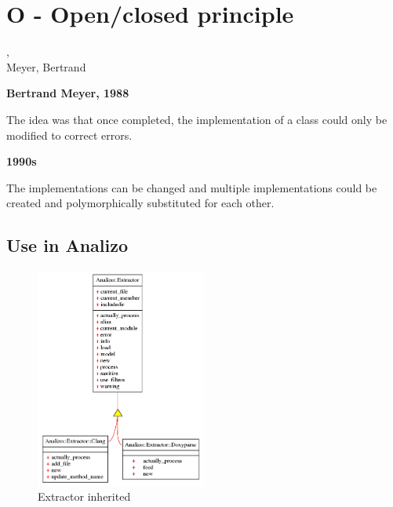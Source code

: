 

\section{O - Open/closed principle} %
\label{sec:o}

\begin{frame}
	, \\Meyer, Bertrand
\end{frame}

\begin{frame}


\begin{Parallel}[v]{5cm}{5cm}
    \ParallelLText%
    {
    	\textbf{Bertrand Meyer, 1988}

    	The idea was that once completed, the implementation of a class could only be modified to correct errors.
    }
    \ParallelRText%
    {
    	\textbf{1990s}

    	The implementations can be changed and multiple implementations could be created and polymorphically substituted for each other.
	}
\end{Parallel}

\end{frame}

\subsection{Use in Analizo} %
\label{sub:use_in_analizo}
\begin{frame}

\begin{figure}[h!]
  \centering
    \includegraphics[width=0.5\textwidth]{conteudo/Extractor}
    \caption{Extractor inherited}
\end{figure}
    
\end{frame}


